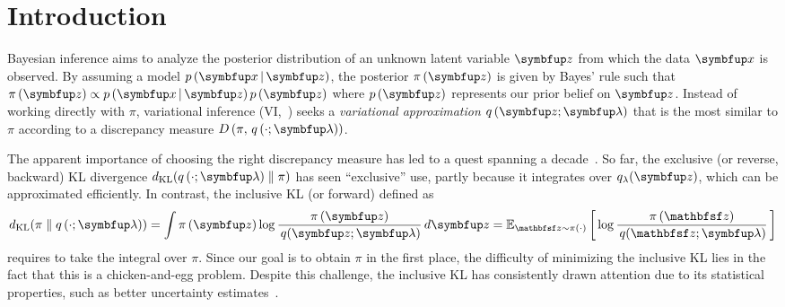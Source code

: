 
\section{Introduction}\label{section:intro}
Bayesian inference aims to analyze the posterior distribution of an unknown latent variable \(\vz\) from which the data \(\vx\) is observed.
By assuming a model \(p\,(\vx\,|\,\vz)\), the posterior \(\pi\,(\vz)\) is given by Bayes' rule such that \(\pi\,(\vz) \propto {p\,(\vx\,|\,\vz)\,p\,(\vz)}\) where \(p\,(\vz)\) represents our prior belief on \(\vz\).
Instead of working directly with \(\pi\), variational inference (VI,~\citealt{blei_variational_2017}) seeks a \textit{variational approximation} \(q\,(\vz; \vlambda)\) that is the most similar to \(\pi\) according to a discrepancy measure \(D\,(\pi,\, q\,(\cdot; \vlambda))\).

The apparent importance of choosing the right discrepancy measure has led to a quest spanning a decade~\citep{NIPS2017_35464c84, NEURIPS2018_1cd138d0, NEURIPS2020_c928d86f, regli_alphabeta_2018, pmlr-v48-hernandez-lobatob16,NIPS2016_7750ca35,pmlr-v37-salimans15,pmlr-v97-ruiz19a,NEURIPS2021_05f971b5,NEURIPS2021_a1a609f1}.
So far, the exclusive (or reverse, backward)  KL divergence \(\DKL{q\left(\cdot; \vlambda\right)}{\pi}\) has seen ``exclusive'' use, partly because it integrates over \(q_{\lambda}(\vz)\), which can be approximated efficiently.
In contrast, the inclusive KL (or forward) defined as
%
{%
\vspace{-0.05in}
\begin{align*}
  \DKL{\pi}{q\left(\cdot; \vlambda\right)}
  = \int \pi\,(\vz) \log \frac{\pi\left(\vz\right)}{\,q(\vz; \vlambda)} \,d\vz
  = \Esub{\rvvz \sim \pi\left(\cdot\right)}{\log \frac{\pi\left(\rvvz\right)}{\,q(\rvvz; \vlambda)} } %
\end{align*}
}%
%
requires to take the integral over \(\pi\).
Since our goal is to obtain \(\pi\) in the first place, the difficulty of minimizing the inclusive KL lies in the fact that this is a chicken-and-egg problem.
Despite this challenge, the inclusive KL has consistently drawn attention due to its statistical properties, such as better uncertainty estimates~\citep{minka2005divergence, mackay_local_2001}.


